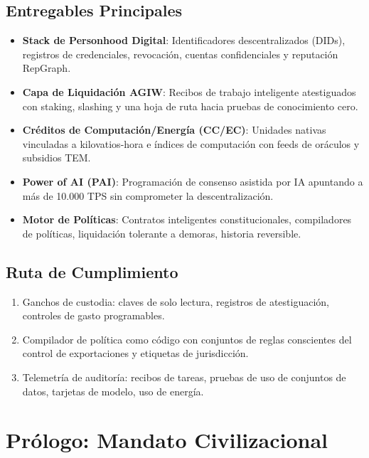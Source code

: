 \documentclass[11pt]{article}
\begin{document}
\subsection{Entregables Principales}
\begin{itemize}[noitemsep]
  \item \textbf{Stack de Personhood Digital}: Identificadores descentralizados (DIDs), registros de credenciales, revocación, cuentas confidenciales y reputación RepGraph.
  \item \textbf{Capa de Liquidación AGIW}: Recibos de trabajo inteligente atestiguados con staking, slashing y una hoja de ruta hacia pruebas de conocimiento cero.
  \item \textbf{Créditos de Computación/Energía (CC/EC)}: Unidades nativas vinculadas a kilovatios-hora e índices de computación con feeds de oráculos y subsidios TEM.
  \item \textbf{Power of AI (PAI)}: Programación de consenso asistida por IA apuntando a más de 10.000 TPS sin comprometer la descentralización.
  \item \textbf{Motor de Políticas}: Contratos inteligentes constitucionales, compiladores de políticas, liquidación tolerante a demoras, historia reversible.
\end{itemize}

\subsection{Ruta de Cumplimiento}
\begin{enumerate}[noitemsep]
  \item Ganchos de custodia: claves de solo lectura, registros de atestiguación, controles de gasto programables.
  \item Compilador de política como código con conjuntos de reglas conscientes del control de exportaciones y etiquetas de jurisdicción.
  \item Telemetría de auditoría: recibos de tareas, pruebas de uso de conjuntos de datos, tarjetas de modelo, uso de energía.
\end{enumerate}

\section{Prólogo: Mandato Civilizacional}
\end{document}
